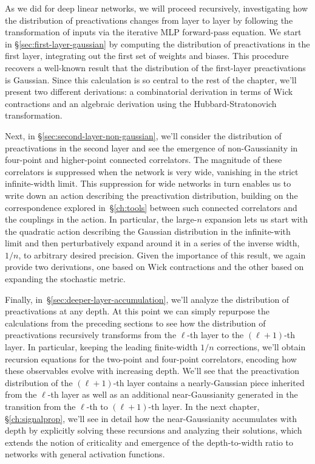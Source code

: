 As we did for deep linear networks, we will proceed recursively, investigating how the
distribution of preactivations changes from layer to layer by following the transformation of inputs
via the iterative MLP forward-pass equation.
We start in \S\ref{sec:first-layer-gaussian} by computing the distribution of preactivations in the first layer, integrating out the first set of weights and biases. This procedure recovers a well-known result that the distribution of the first-layer preactivations is Gaussian.
Since this calculation is so central to the rest of the chapter, we'll present two different derivations: a combinatorial derivation in terms of Wick contractions and an algebraic derivation using the Hubbard-Stratonovich transformation.


Next, in \S\ref{sec:second-layer-non-gaussian}, we'll consider the
distribution of preactivations in the second layer and see the emergence of non-Gaussianity in four-point and higher-point connected correlators.
The magnitude of these correlators is
suppressed when the network is very wide, vanishing in the strict infinite-width limit.
This suppression for wide networks in turn enables us to write down an action describing the preactivation distribution, building on the correspondence explored in~\S\ref{ch:tools} between such connected correlators and the couplings in the action.
In particular, the large-$n$ expansion lets us start with the quadratic action describing the Gaussian distribution in the infinite-with limit and then perturbatively expand around it in a series of the inverse width, $1/n$, to arbitrary desired precision.
Given the importance of this result, we again provide two derivations, one based on Wick contractions and the other based on expanding the stochastic metric.

Finally, in~\S\ref{sec:deeper-layer-accumulation}, we'll analyze the
distribution of preactivations at any depth.
At this point we can simply repurpose the calculations from the preceding sections to see how the distribution of preactivations recursively transforms from the $\ell$-th layer to the $(\ell+1)$-th layer.
In particular, keeping the leading finite-width $1/n$ corrections, we'll obtain recursion equations for the two-point and 
four-point correlators,
encoding how these observables evolve with increasing depth.
We'll see that the preactivation distribution of the $(\ell+1)$-th layer contains a nearly-Gaussian piece inherited from the $\ell$-th layer as well as an additional near-Gaussianity generated in the transition from the $\ell$-th to $(\ell+1)$-th layer.
In the next chapter, \S\ref{ch:signalprop}, we'll see in detail how the near-Gaussianity accumulates with depth by explicitly solving these recursions and analyzing their solutions, which extends the notion of criticality and emergence of the depth-to-width ratio to networks with general activation functions.


